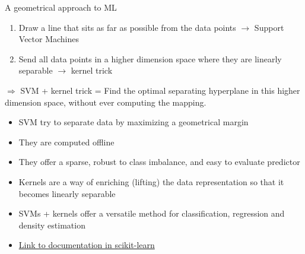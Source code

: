 \documentclass[10pt,a4paper,t,aspectratio=1610,dvipsnames]{beamer}
\begin{document}
\begin{frame}{A geometrical approach to ML}
\begin{block}{}
	\begin{enumerate}
		\item Draw a line that sits as far as possible from the data points $\rightarrow$ Support Vector Machines
		\item Send all data points in a higher dimension space where they are linearly separable $\rightarrow$ kernel trick
	\end{enumerate}
	$\Rightarrow$ SVM + kernel trick = Find the optimal separating hyperplane in this higher dimension space, without ever computing the mapping.
\end{block}
\begin{itemize}
	\item SVM try to separate data by maximizing a geometrical margin
	\item They are computed offline
	\item They offer a sparse, robust to class imbalance, and easy to evaluate predictor
	\item Kernels are a way of enriching (lifting) the data representation so that it becomes linearly separable
	\item SVMs + kernels offer a versatile method for classification, regression and density estimation
	\item \href{http://scikit-learn.org/stable/modules/svm.html}{Link to documentation in scikit-learn}
\end{itemize}
\end{frame}
\end{document}
